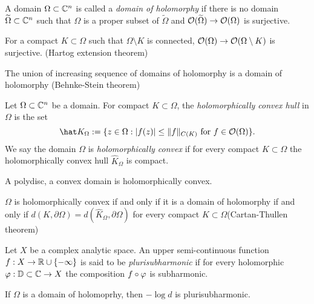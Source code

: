 \documentclass{../../large}
\begin{document}
\begin{prb}
A domain $\Omega\subset\mathbb{C}^n$ is called a \emph{domain of holomorphy} if there is no domain $\widetilde\Omega\subset\mathbb{C}^n$ such that $\Omega$ is a proper subset of $\tilde\Omega$ and $\mathcal{O}(\widetilde\Omega)\to\mathcal{O}(\Omega)$ is surjective.
\begin{parts}
\item For a compact $K\subset\Omega$ such that $\Omega\setminus K$ is connected, $\mathcal{O}(\Omega)\to\mathcal{O}(\Omega\setminus K)$ is surjective. (Hartog extension theorem)
\item The union of increasing sequence of domains of holomorphy is a domain of holomorphy (Behnke-Stein theorem)
\end{parts}
\end{prb}



\begin{prb}
Let $\Omega\subset\mathbb{C}^n$ be a domain.
For compact $K\subset\Omega$, the \emph{holomorphically convex hull} in $\Omega$ is the set
\[\hat K_\Omega:=\{z\in\Omega:|f(z)|\le\|f\|_{C(K)}\text{ for }f\in\cO(\Omega)\}.\]
We say the domain $\Omega$ is \emph{holomorphically convex} if for every compact $K\subset\Omega$ the holomorphically convex hull $\hat K_\Omega$ is compact.
\begin{parts}
\item A polydisc, a convex domain is holomorphically convex.
\item $\Omega$ is holomorphically convex if and only if it is a domain of holomorphy if and only if $d(K,\partial\Omega)=d(\hat K_\Omega,\partial\Omega)$ for every compact $K\subset\Omega$(Cartan-Thullen theorem)
\end{parts}
\end{prb}

\begin{prb}
Let $X$ be a complex analytic space.
An upper semi-continuous function $f:X\to\mathbb{R}\cup\{-\infty\}$ is said to be \emph{plurisubharmonic} if for every holomorphic $\varphi:\mathbb{D}\subset\mathbb{C}\to X$ the composition $f\circ\varphi$ is subharmonic.
\begin{parts}
\item If $\Omega$ is a domain of holomoprhy, then $-\log d$ is plurisubharmonic.
\end{parts}
\end{prb}

\begin{prb}
\end{prb}
\end{document}
